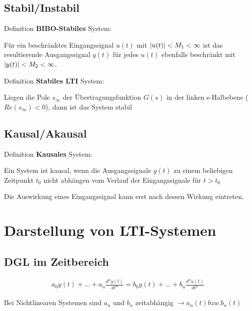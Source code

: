 \documentclass[10pt,a4paper]{article}
\begin{document}
  \subsection{Stabil/Instabil}
  Definition \textbf{BIBO-Stabiles} System:
  \begin{mdframed}[style=exercise]
      Für ein beschränktes Eingangssignal $u(t)$ mit $\abs{u(t)} < M_1 < \infty$ 
      ist das resultierende Ausgangssignal $y(t)$ für jedes $u(t)$ ebenfalls beschränkt mit $\abs{y(t)} < M_2 < \infty$.
  \end{mdframed}
  Definition \textbf{Stabiles LTI} System:
  \begin{mdframed}[style=exercise]
      Liegen die Pole $s_\infty$ der Übertragungsfunktion $G(s)$ in der linken s-Halbebene ($Re(s_\infty) < 0$), 
      dann ist das System stabil
  \end{mdframed}

  \subsection{Kausal/Akausal}
  Definition \textbf{Kausales} System:
  \begin{mdframed}[style=exercise]
      Ein System ist kausal, wenn die Ausgangssignale $y(t)$ zu einem beliebigen Zeitpunkt $t_0$ nicht abhängen vom 
      Verlauf der Eingangssignale für $t>t_0$
  \end{mdframed}
  Die Auswirkung eines Eingangssignal kann erst nach dessen Wirkung eintreten.


\section{Darstellung von LTI-Systemen}

  \subsection{DGL im Zeitbereich}
  \begin{mdframed}[style=exercise]
    \begin{align}
        a_0y(t)+ ... + a_n \frac{d^n y(t)}{dt^n} = b_0y(t)+ ... + b_n\frac{d^n u(t)}{dt^n}
    \end{align}
  \end{mdframed}
  Bei Nichtlinearen Systemen sind $a_n$ und $b_n$ zeitabhängig $\rightarrow a_n(t) bzw. b_n(t) $
\end{document}
